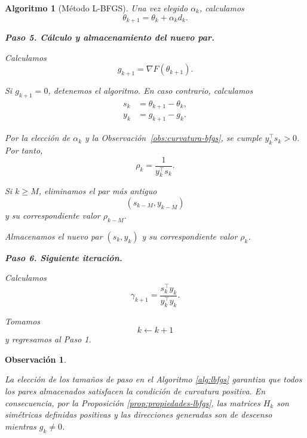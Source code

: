 \documentclass[a4paper,openany,oneside,10pt]{report}
\theoremstyle{pnlTeorema}
\theoremstyle{pnlDefinicion}
\newtheorem{algoritmo}{Algoritmo}[section]
\theoremstyle{pnlObservacion}
\newtheorem{observacion}{Observación}[section]
\begin{document}
\begin{algoritmo}[Método L-BFGS]
Una vez elegido $\alpha_k$, calculamos
\[
    \theta_{k+1}=\theta_k+\alpha_k d_k.
\]

\medskip

\noindent\textbf{Paso 5. Cálculo y almacenamiento
del nuevo par.}\par\nobreak
Calculamos
\[
    g_{k+1}=\nabla F(\theta_{k+1}).
\]

Si $g_{k+1}=0$, detenemos el algoritmo.
En caso contrario, calculamos
\[
    \begin{aligned}
        s_k&=\theta_{k+1}-\theta_k,\\
        y_k&=g_{k+1}-g_k.
    \end{aligned}
\]

Por la elección de $\alpha_k$ y la Observación~\ref{obs:curvatura-bfgs},
se cumple $y_k^\top s_k>0$. Por tanto,
\[
    \rho_k=\frac{1}{y_k^\top s_k}.
\]

Si $k\geq M$, eliminamos el par más antiguo
\[
    (s_{k-M},y_{k-M})
\]
y su correspondiente valor $\rho_{k-M}$.

Almacenamos el nuevo par $(s_k,y_k)$ y su
correspondiente valor $\rho_k$.

\medskip

\noindent\textbf{Paso 6. Siguiente iteración.}

Calculamos
\[
    \gamma_{k+1}=
    \frac{s_k^\top y_k}{y_k^\top y_k}.
\]

Tomamos
\[
    k\leftarrow k+1
\]
y regresamos al Paso 1.

\end{algoritmo}

\begin{observacion}
\label{obs:curvatura-lbfgs}

La elección de los tamaños de paso en el
Algoritmo \ref{alg:lbfgs} garantiza que todos los pares
almacenados satisfacen la condición de curvatura positiva.
En consecuencia, por la Proposición
\ref{prop:propiedades-lbfgs}, las matrices $H_k$
son simétricas definidas positivas y las direcciones
generadas son de descenso mientras $g_k\neq 0$.

\end{observacion}
\end{document}
